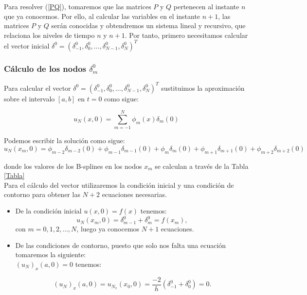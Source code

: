  
 Para resolver (\ref{PQ}), tomaremos que las matrices $P$ y $Q$ pertenecen al instante $n$ que ya conocemos. Por ello, al calcular las variables en el instante $n+1$, las matrices $P$ y $Q$ serán conocidas y obtendremos un sistema lineal y recursivo, que relaciona los niveles de tiempo $n$ y $n+1$. Por tanto, primero necesitamos calcular el vector inicial $\delta^{0}=(\delta_{-1}^{0},\delta_{0}^{0},\dots,\delta_{N-1}^{0},\delta_{N}^{0})^{T}$
 
 
 \subsubsection{Cálculo de los nodos $\delta_{m}^{0}$}
 
 Para calcular el vector $\delta^{0}=(\delta_{-1}^{0},\delta_{0}^{0},\dots,\delta_{N-1}^{0},\delta_{N}^{0})^{T}$ sustituimos la aproximación sobre el intervalo $[a,b]$ en $t=0$ como sigue:
 
 \begin{equation}
     u_{N}(x,0)=\sum_{m=-1}^{N}\phi_{m}(x)\delta_{m}(0)
 \end{equation}
 
 Podemos escribir la solución como sigue:
 $$u_{N}(x_{m},0)=\phi_{m-2}\delta_{m-2}(0)+\phi_{m-1}\delta_{m-1}(0)+\phi_{m}\delta_{m}(0)+\phi_{m+1}\delta_{m+1}(0)+\phi_{m+2}\delta_{m+2}(0)$$
 
 \noindent donde los valores de los B-splines en los nodos $x_{m}$ se calculan a través de la Tabla \ref{Tabla}\\
 
 
 Para el cálculo del vector utilizaremos la condición inicial y una condición de contorno para obtener las $N+2$ ecuaciones necesarias.
 
 \begin{itemize}
    \item De la condición inicial $u(x,0)=f(x)$ tenemos:
    $$u_{N}(x_{m},0)=\delta_{m-1}^{0}+\delta_{m}^{0}=f(x_{m}),$$ con $m=0,1,2,\dots,N$, luego ya conocemos $N+1$ ecuaciones.
\end{itemize}

\begin{itemize}
    \item De las condiciones de contorno, puesto que solo nos falta una ecuación tomaremos la siguiente:\\
    
         $(u_{N})_{x}(a,0)=0$  tenemos:
         
        $$(u_{N})_{x}(a,0)=u_{N}_{x}(x_{0},0)=\frac{-2}{h}(\delta_{-1}^{0}+\delta_{0}^{0})=0.$$
\end{itemize}

